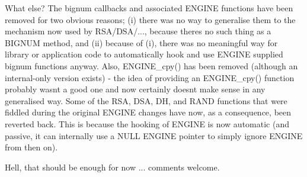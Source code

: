 What else? The bignum callbacks and associated ENGINE functions have been removed for two obvious reasons; (i) there was no way to generalise them to the mechanism now used by RSA/\+DSA/..., because there\textquotesingle{}s no such thing as a BIGNUM method, and (ii) because of (i), there was no meaningful way for library or application code to automatically hook and use ENGINE supplied bignum functions anyway. Also, ENGINE\+\_\+cpy() has been removed (although an internal-\/only version exists) -\/ the idea of providing an ENGINE\+\_\+cpy() function probably wasn\textquotesingle{}t a good one and now certainly doesn\textquotesingle{}t make sense in any generalised way. Some of the RSA, DSA, DH, and RAND functions that were fiddled during the original ENGINE changes have now, as a consequence, been reverted back. This is because the hooking of ENGINE is now automatic (and passive, it can internally use a NULL ENGINE pointer to simply ignore ENGINE from then on).

Hell, that should be enough for now ... comments welcome. 
